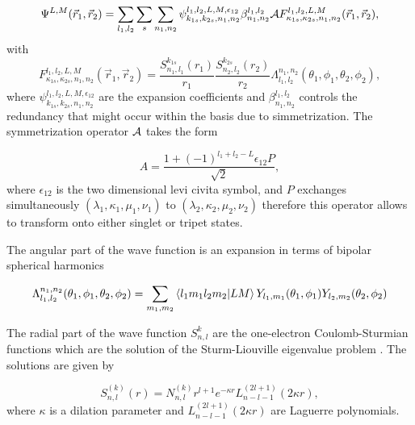 \begin{equation}  \label{waveexpansion}
\Psi^{L,M}(\vec{r}_{1},\vec{r}_{2})=\sum_{l_{1},l_{2}}\sum_{s}\sum_{n_{1},n_{2}}\psi_{k_{1s},k_{2s},n_{1},n_{2}}^{l_{1},l_{2},L,M,\epsilon_{12}}\beta_{n_{1},n_{2}}^{l_{1},l_{2}} {\cal A}  F_{\kappa_{1s}, \kappa_{2s},n_{1},n_{2}}^{l_{1},l_{2},L,M}(\vec{r}_{1},\vec{r}_{2}),
\end{equation}
with 
\begin{equation}
F_{\kappa_{1s}, \kappa_{2s},n_{1},n_{2}}^{l_{1},l_{2},L,M}(\vec{r}_{1},\vec{r}_{2})=\frac{S_{n_{1},l_{1}}^{k_{1s}}(r_{1})}{r_{1}}\frac{S_{n_{2},l_{2}}^{k_{2s}}(r_{2})}{r_{2}}\Lambda_{l_{1},l_{2}}^{n_{1},n_{2}}(\theta_{1},\phi_{1},\theta_{2},\phi_{2}),
\end{equation}
where $ \psi_{k_{1s},k_{2s},n_{1},n_{2}}^{l_{1},l_{2},L,M,\epsilon_{12}} $ are the expansion coefficients and $ \beta_{n_{1},n_{2}}^{l_{1},l_{2}}  $ controls the redundancy that might occur within the basis due to simmetrization. The symmetrization operator $ \cal{A} $ takes the form 

\begin{equation}
A=\frac{1+(-1)^{l_{1}+l_{2}-L}\epsilon_{12}P}{\sqrt{2}},	
\end{equation}
where  $ \epsilon_{12} $ is the two dimensional levi civita symbol, and $ P $ exchanges simultaneously $ (\lambda_{1},\kappa_{1},\mu_{1},\nu_{1}) $ to $ (\lambda_{2},\kappa_{2},\mu_{2},\nu_{2}) $ therefore this operator allows to transform onto either singlet or tripet states. 

The angular part of the wave function is an expansion in terms of bipolar spherical harmonics \cite{varshalovich1988quantum}

\begin{equation}
\Lambda_{l_{1},l_{2}}^{n_{1},n_{2}}(\theta_{1},\phi_{1},\theta_{2},\phi_{2})=\sum_{m_{1},m_{2}} \bra{l_{1}m_{1}l_{2}m_{2}} \ket{LM} Y_{l_{1},m_{1}}(\theta_{1},\phi_{1})Y_{l_{2},m_{2}}(\theta_{2},\phi_{2})
\end{equation}

The radial part of the wave function $ S_{n,l}^{k} $ are the one-electron Coulomb-Sturmian functions which are the solution of the Sturm-Liouville eigenvalue problem \cite{thesisjavier}. The solutions are given by

\begin{equation}\label{key}
S_{n,l}^{(k)}(r)=N_{n,l}^{(k)}r^{l+1} e^{-\kappa r}L_{n-l-1}^{(2l+1)}(2\kappa r),
\end{equation}
where $ \kappa $ is a dilation parameter and $ L_{n-l-1}^{(2l+1)}(2\kappa r) $ are Laguerre polynomials. 

